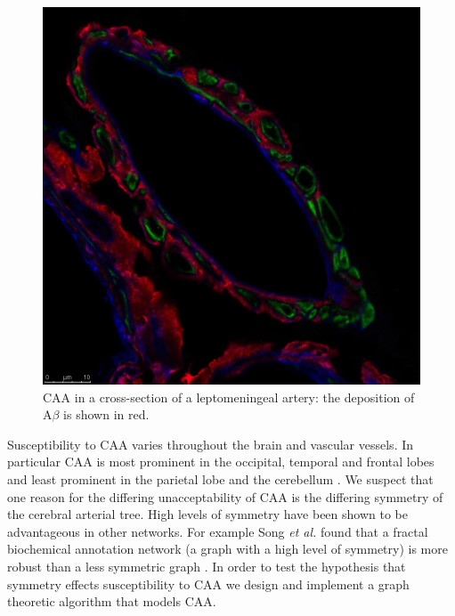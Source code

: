 \documentclass[12pt]{article} %
\theoremstyle{definition}
\begin{document}
\begin{figure}

              \centering
               \includegraphics[scale=0.15]{abeta.jpg}
                \caption{CAA in a cross-section of a leptomeningeal artery: the deposition of A$\beta$ is shown in red.}\label{figy:2}
\end{figure}

Susceptibility to CAA varies throughout the brain and vascular vessels.  In particular  
CAA  is most prominent in the occipital, temporal and frontal lobes and least prominent in the parietal lobe and the cerebellum %
\cite{Preston}. We suspect that one reason for the differing unacceptability of CAA is the differing symmetry of the cerebral arterial tree.  High levels of symmetry have been shown to be advantageous in other networks.  For example Song \emph{et al.} found that a fractal biochemical annotation  network (a graph with a high level of symmetry) is more robust than a less symmetric graph \cite{Song}.  In order to test the hypothesis that symmetry effects susceptibility to CAA we design and implement a graph theoretic algorithm that models CAA.%
\end{document}
